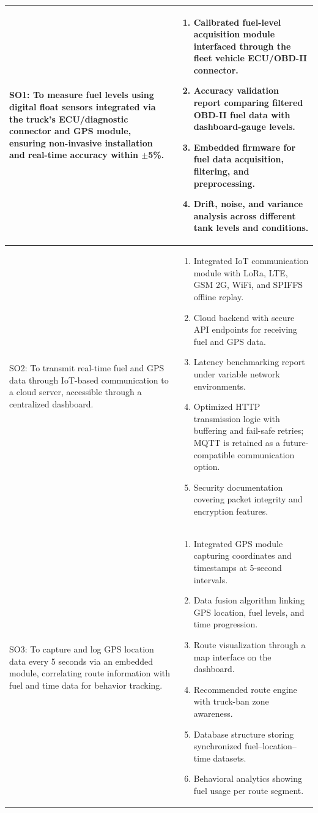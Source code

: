 \begin{SingleSpace}
\begin{longtable}{|p{}|p{}|}
SO1: To measure fuel levels using digital float sensors integrated via the truck's ECU/diagnostic connector and GPS module, ensuring non-invasive installation and real-time accuracy within $\pm$5\%. &
\begin{enumerate}
    \item Calibrated fuel-level acquisition module interfaced through the fleet vehicle ECU\glsadd{ECU}/OBD-II connector.
    \item Accuracy validation report comparing filtered OBD-II fuel data with dashboard-gauge levels.
    \item Embedded firmware for fuel data acquisition, filtering, and preprocessing.
    \item Drift, noise, and variance analysis across different tank levels and conditions.
\end{enumerate} \\
\hline

SO2: To transmit real-time fuel and GPS data through IoT-based communication to a cloud server, accessible through a centralized dashboard. &
\begin{enumerate}
    \item Integrated IoT communication module with LoRa\glsadd{LoRa}, LTE\glsadd{LTE}, GSM 2G, WiFi\glsadd{WiFi}, and SPIFFS\glsadd{SPIFFS} offline replay.
    \item Cloud backend with secure API\glsadd{API} endpoints for receiving fuel and GPS data.
    \item Latency benchmarking report under variable network environments.
    \item Optimized HTTP\glsadd{HTTP} transmission logic with buffering and fail-safe retries; MQTT\glsadd{MQTT} is retained as a future-compatible communication option.
    \item Security documentation covering packet integrity and encryption features.
\end{enumerate} \\
\hline

SO3: To capture and log GPS location data every 5 seconds via an embedded module, correlating route information with fuel and time data for behavior tracking. &
\begin{enumerate}
    \item Integrated GPS module capturing coordinates and timestamps at 5-second intervals.
    \item Data fusion algorithm linking GPS location, fuel levels, and time progression.
    \item Route visualization through a map interface on the dashboard.
    \item Recommended route engine with truck-ban zone awareness.
    \item Database structure storing synchronized fuel–location–time datasets.
    \item Behavioral analytics showing fuel usage per route segment.
\end{enumerate} \\
\hline


\end{longtable}
\end{SingleSpace}
